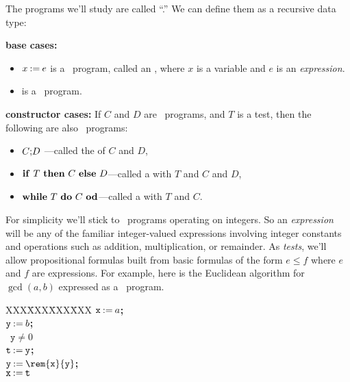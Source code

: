 The programs we'll study are called ``.''  We
can define them as a recursive data type:
\begin{definition}\label{whiledef} \mbox{}

\textbf{base cases:}
\begin{itemize}

\item $x \mathbin{\mathtt{:=}} e$ is a \while\ program, called an , where $x$ is a variable and $e$ is an \emph{expression}.

\item \term{$\halt$} is a \while\ program.

\end{itemize}

\textbf{constructor cases:}
If $C$ and $D$ are \while\ programs, and $T$ is a test, then the following are also
\while\ programs:
\begin{itemize}

\item $C\mathbf{;}D$
---called the  of $C$ and $D$,

\item $\text{\textbf{if}}\ T\ \text{\textbf{then}}\ C\ \text{\textbf{else}}\ D$---called a  with
   $T$ and  $C$ and $D$,

\item $\text{\textbf{while}}\ T\ \text{\textbf{do}}\ C\ \text{\textbf{od}}$---called a  with  $T$ and  $C$.

\end{itemize}
\end{definition}

For simplicity we'll stick to \while\ programs operating on integers.
So an \emph{expression} will be any of the familiar integer-valued
expressions involving integer constants and operations such as
addition, multiplication, or remainder.  As \emph{tests}, we'll allow
propositional formulas built from basic formulas of the form $e \leq
f$ where $e$ and $f$ are expressions.  For example, here is the
Euclidean algorithm for $\gcd(a,b)$ expressed as a \while\ program.
\begin{center}
\begin{tabbing}
XXX\=XXX\=XXX\=XXX\kill
$\mathtt{x} \mathbin{\mathtt{:=}} a$\textbf{;} \\
$\mathtt{y} \mathbin{\mathtt{:=}} b$\textbf{;} \\
\while\ $\mathtt{y} \neq 0$ \docomm\\
   \> $\mathtt{t} \mathbin{\mathtt{:=}} \mathtt{y}$\textbf{;}\\
   \> $\mathtt{y} \assigned \rem{\mathtt{x}}{\mathtt{y}}$\textbf{;}\\
   \> $\mathtt{x} \mathbin{\mathtt{:=}} \mathtt{t}$
\odcomm\\
\end{tabbing}
\end{center}

